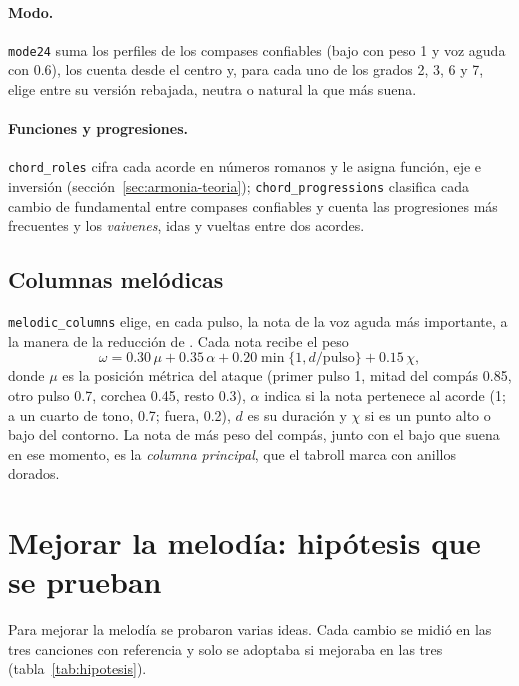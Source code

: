 \paragraph{Modo.} \texttt{mode24} suma los perfiles de los compases confiables (bajo con peso 1 y voz aguda con 0.6),
los cuenta desde el centro y, para cada uno de los grados 2, 3, 6 y 7, elige entre su versión rebajada, neutra o natural
la que más suena.

\paragraph{Funciones y progresiones.} \texttt{chord\_roles} cifra cada acorde en números romanos y le asigna función,
eje e inversión (sección~\ref{sec:armonia-teoria}); \texttt{chord\_progressions} clasifica cada cambio de fundamental entre
compases confiables y cuenta las progresiones más frecuentes y los \emph{vaivenes}, idas y vueltas entre dos acordes.

\subsection{Columnas melódicas}

\texttt{melodic\_columns} elige, en cada pulso, la nota de la voz aguda más importante, a la manera de la reducción de
\citet{lerdahl1983}. Cada nota recibe el peso
\[
  \omega = 0.30\, \mu + 0.35\, \alpha + 0.20 \min\{1, d/\text{pulso}\} + 0.15\, \chi,
\]
donde $\mu$ es la posición métrica del ataque (primer pulso 1, mitad del compás 0.85, otro pulso 0.7, corchea 0.45, resto
0.3), $\alpha$ indica si la nota pertenece al acorde (1; a un cuarto de tono, 0.7; fuera, 0.2), $d$ es su duración y
$\chi$ si es un punto alto o bajo del contorno. La nota de más peso del compás, junto con el bajo que suena en ese
momento, es la \emph{columna principal}, que el tabroll marca con anillos dorados.

\section{Mejorar la melodía: hipótesis que se prueban}\label{sec:melodia-hipotesis}

Para mejorar la melodía se probaron varias ideas. Cada cambio se midió en las tres canciones con referencia y solo se
adoptaba si mejoraba en las tres (tabla~\ref{tab:hipotesis}).

